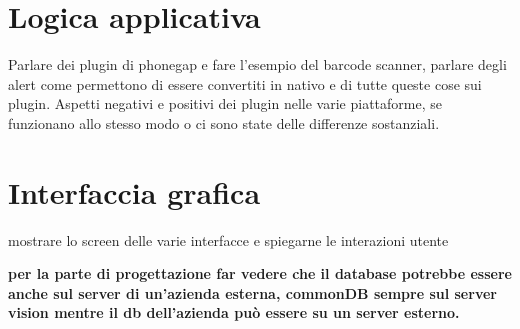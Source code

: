 \section{Logica applicativa}

Parlare dei plugin di phonegap e fare l'esempio del barcode scanner, parlare degli alert come permettono di essere convertiti in nativo e di tutte queste cose sui plugin. Aspetti negativi e positivi dei plugin nelle varie piattaforme, se funzionano allo stesso modo o ci sono state delle differenze sostanziali.

\section{Interfaccia grafica}

mostrare lo screen delle varie interfacce e spiegarne le interazioni utente

\textbf{per la parte di progettazione far vedere che il database potrebbe essere anche sul server di un'azienda esterna, commonDB sempre sul server vision mentre il db dell'azienda può essere su un server esterno.}
